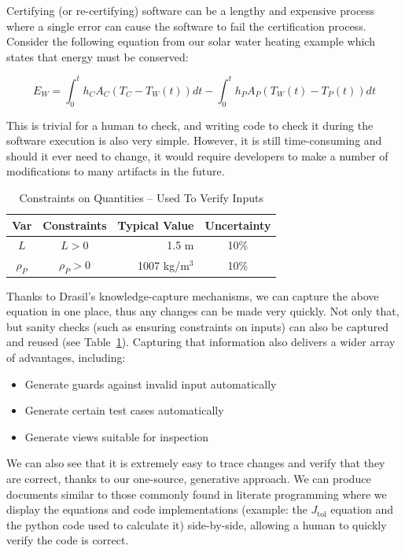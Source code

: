 \documentclass[sigconf]{acmart}
\newcommand{\jtol}{$J_{\mbox{tol}}$}
\begin{document}
Certifying (or re-certifying) software can be a lengthy and expensive process 
where a single error can cause the software to fail the certification process. 
Consider the following equation from our solar water heating example which 
states that energy must be conserved:

\begin{equation*}
E_W = \int_{0}^{t} h_C A_C (T_C - T_W(t)) dt - \int_{0}^{t} h_P A_P (T_W(t) - T_P(t)) dt
\end{equation*}

This is trivial for a human to check, and writing code to check it during the 
software execution is also very simple. However, it is still time-consuming and 
should it ever need to change, it would require developers to make a number of 
modifications to many artifacts  in the future.

\begin{table} 
\centering
\caption{Constraints on Quantities -- Used To Verify Inputs}
\begin{tabular}{c c r c } 
\toprule
\textbf{Var} & \textbf{Constraints} & \textbf{Typical Value} & \textbf{Uncertainty}\\ \midrule
$L$ & $L > 0$ & 1.5 m & 10\% \\ 
$\rho_P$ & $\rho_P > 0$	& 1007 kg/m$^3$	& 10\% \\
\bottomrule
\end{tabular}
\label{tab:pcm}
\end{table}

Thanks to Drasil's knowledge-capture mechanisms, we can capture the above 
equation in one place, thus any changes can be made very quickly. Not only 
that, but sanity checks (such as ensuring constraints on inputs) can also be 
captured and reused (see Table~\ref{tab:pcm}). Capturing that information also 
delivers a wider array of advantages, including:

\begin{itemize}
\item Generate guards against invalid input automatically
\item Generate certain test cases automatically
\item Generate views suitable for inspection
\end{itemize}
We can also see that it is extremely easy to trace changes and verify that they 
are correct, thanks to our one-source, generative approach. We can produce 
documents similar to those commonly found in literate programming where we 
display the equations and code implementations (example: the \jtol{} equation 
and the python code used to calculate it) side-by-side, allowing a human to 
quickly verify the code is correct.
\end{document}
